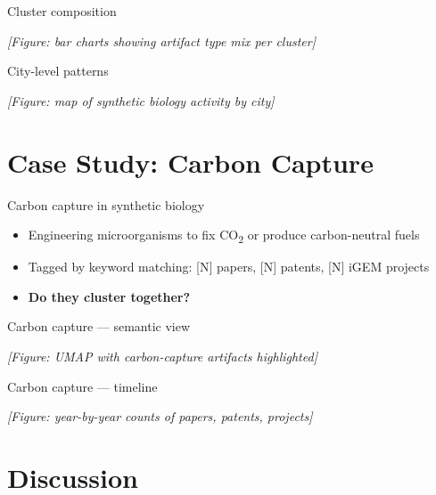 \documentclass[aspectratio=169, 12pt]{beamer}
\begin{document}
\begin{frame}{Cluster composition}
  \begin{center}
    \textit{[Figure: bar charts showing artifact type mix per cluster]}
  \end{center}
\end{frame}

\begin{frame}{City-level patterns}
  \begin{center}
    \textit{[Figure: map of synthetic biology activity by city]}
  \end{center}
\end{frame}

\section{Case Study: Carbon Capture}

\begin{frame}{Carbon capture in synthetic biology}
  \begin{itemize}
    \item Engineering microorganisms to fix CO\textsubscript{2} or produce carbon-neutral fuels
    \item Tagged by keyword matching: [N] papers, [N] patents, [N] iGEM projects
    \item \textbf{Do they cluster together?}
  \end{itemize}
\end{frame}

\begin{frame}{Carbon capture — semantic view}
  \begin{center}
    \textit{[Figure: UMAP with carbon-capture artifacts highlighted]}
  \end{center}
\end{frame}

\begin{frame}{Carbon capture — timeline}
  \begin{center}
    \textit{[Figure: year-by-year counts of papers, patents, projects]}
  \end{center}
\end{frame}

\section{Discussion}
\end{document}
